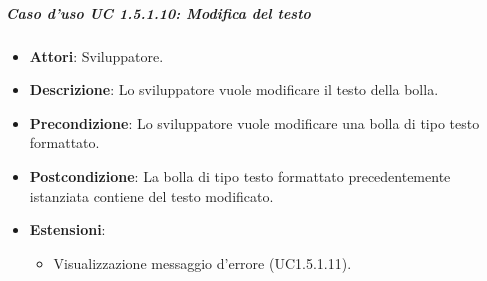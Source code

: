 \subparagraph{Caso d'uso UC 1.5.1.10: Modifica del testo}


\FloatBarrier
\begin{itemize}
\item\textbf{Attori}: Sviluppatore.
\item\textbf{Descrizione}: Lo sviluppatore vuole modificare il testo della bolla.
\item\textbf{Precondizione}: Lo sviluppatore vuole modificare una bolla di tipo testo formattato.
\item\textbf{Postcondizione}: La bolla di tipo testo formattato precedentemente istanziata contiene del testo modificato.
\item\textbf{Estensioni}: 
\begin{itemize}

\item Visualizzazione messaggio d'errore (UC1.5.1.11).

\end{itemize}

\end{itemize}

